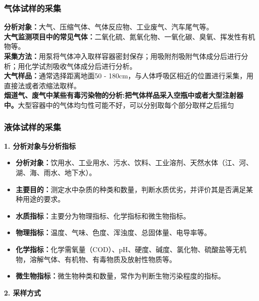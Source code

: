\documentclass[12pt,a4paper]{article}
\numberwithin{equation}{section}
\begin{document}
\subsubsection*{气体试样的采集}
{\bf{分析对象：}}大气、压缩气体、气体反应物、工业废气、汽车尾气等。\\
{\bf{大气监测项目中的常见气体：}}二氧化硫、氮氧化物、一氧化碳、臭氧、挥发性有机物等。\\
{\bf{采集方法：}}用泵将气体冲入取样容器密封保存；用吸附剂吸附气体成分后进行分析；用化学试剂吸收气体成分后进行分析。\\
{\bf{大气样品：}}通常选择距离地面50 - 180cm，与人体呼吸区相近的位置进行采集，用直接法或者浓缩法取样。\\
{\bf{烟道气、废气中某些有毒污染物的分析:}把气体样品采入空瓶中或者大型注射器中。}大型容器中的气体均匀性可能不好，可以分别取每个部分取样之后摇匀
\subsubsection*{液体试样的采集}
\bf{1. 分析对象与分析指标}

\begin{itemize}
    \item \textbf{分析对象：}饮用水、工业用水、污水、饮料、工业溶剂、天然水体（江、河、湖、海、雨水、地下水）。
    
    \item \textbf{主要目的：}测定水中杂质的种类和数量，判断水质优劣，并评价其是否满足某种用途的要求。
    
    \item \textbf{水质指标：}主要分为物理指标、化学指标和微生物指标。
    
    \item \textbf{物理指标：}温度、气味、色度、浑浊度、总固体量、电导率等。
    
    \item \textbf{化学指标：}化学需氧量（COD）、pH、硬度、碱度、氯化物、硫酸盐等无机物，溶解气体、有机物、有毒物质及放射性物质等。
    
    \item \textbf{微生物指标：}微生物种类和数量，常作为判断生物污染程度的指标。
\end{itemize}

\bf{2. 采样方式}
\end{document}
